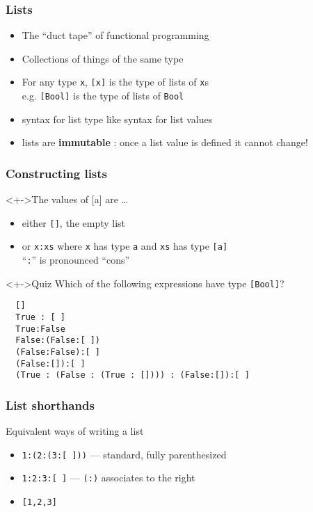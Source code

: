 \documentclass{beamer}
\begin{document}
\begin{frame}
  \frametitle{Lists}
  \begin{itemize}
  \item The “duct tape” of functional programming
  \item Collections of things of the same type 
  \item 
    For any type \texttt{x}, \texttt{[x]} is the type of lists of \texttt{x}s
    \\ e.g. \texttt{[Bool]} is the type of lists of \texttt{Bool}
  \item  syntax for list type like syntax for list values
  \item lists are \textbf{immutable} : once a list value is defined it cannot change!
  \end{itemize}
\end{frame}
\begin{frame}[fragile]
  \frametitle{Constructing lists}
  \begin{block}<+->{The values of [a] are \dots}
    \begin{itemize}
    \item either \texttt{[]}, the empty list
    \item or \texttt{x:xs} where \texttt{x} has type \texttt{a} and
      \texttt{xs} has type \texttt{[a]} \\
      ``\texttt{:}'' is pronounced ``cons''
    \end{itemize}
  \end{block}
  \begin{block}<+->{Quiz}
    Which of the following expressions have type \texttt{[Bool]}?
\begin{verbatim}
  []
  True : [ ]
  True:False
  False:(False:[ ])
  (False:False):[ ]
  (False:[]):[ ]
  (True : (False : (True : []))) : (False:[]):[ ]
\end{verbatim}
  \end{block}
\end{frame}
\begin{frame}
  \frametitle{List shorthands}
  \begin{block}{Equivalent ways of writing a list}
    \begin{itemize}
    \item \texttt{1:(2:(3:[ ]))}  --- standard, fully parenthesized
    \item \texttt{1:2:3:[ ]} --- \texttt{(:)} associates to the right
    \item \texttt{[1,2,3]}
    \end{itemize}
  \end{block}
\end{frame}
\end{document}

